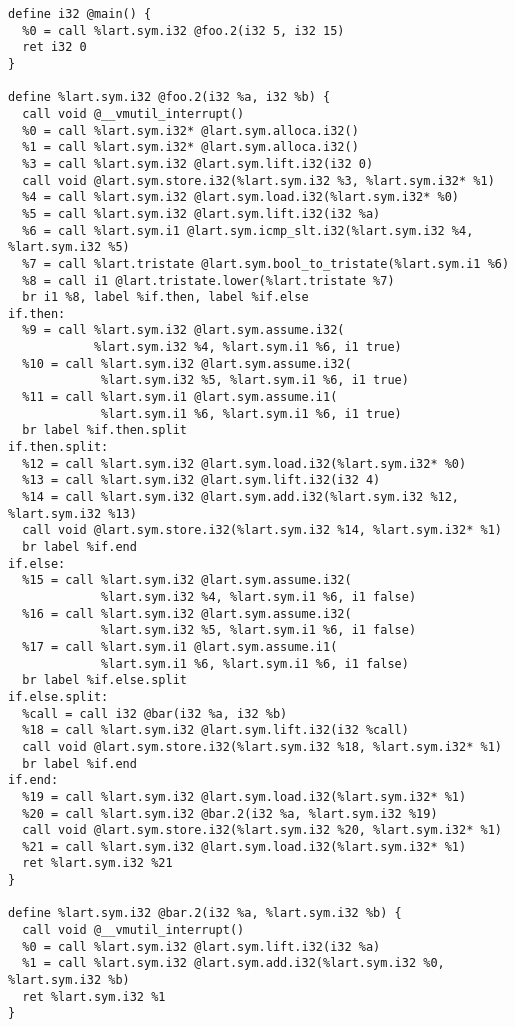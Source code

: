 \begin{verbatim}
define i32 @main() {
  %0 = call %lart.sym.i32 @foo.2(i32 5, i32 15)
  ret i32 0
}

define %lart.sym.i32 @foo.2(i32 %a, i32 %b) {
  call void @__vmutil_interrupt()
  %0 = call %lart.sym.i32* @lart.sym.alloca.i32()
  %1 = call %lart.sym.i32* @lart.sym.alloca.i32()
  %3 = call %lart.sym.i32 @lart.sym.lift.i32(i32 0)
  call void @lart.sym.store.i32(%lart.sym.i32 %3, %lart.sym.i32* %1)
  %4 = call %lart.sym.i32 @lart.sym.load.i32(%lart.sym.i32* %0)
  %5 = call %lart.sym.i32 @lart.sym.lift.i32(i32 %a)
  %6 = call %lart.sym.i1 @lart.sym.icmp_slt.i32(%lart.sym.i32 %4, %lart.sym.i32 %5)
  %7 = call %lart.tristate @lart.sym.bool_to_tristate(%lart.sym.i1 %6)
  %8 = call i1 @lart.tristate.lower(%lart.tristate %7)
  br i1 %8, label %if.then, label %if.else
if.then:
  %9 = call %lart.sym.i32 @lart.sym.assume.i32(
            %lart.sym.i32 %4, %lart.sym.i1 %6, i1 true)
  %10 = call %lart.sym.i32 @lart.sym.assume.i32(
             %lart.sym.i32 %5, %lart.sym.i1 %6, i1 true)
  %11 = call %lart.sym.i1 @lart.sym.assume.i1(
             %lart.sym.i1 %6, %lart.sym.i1 %6, i1 true)
  br label %if.then.split
if.then.split:
  %12 = call %lart.sym.i32 @lart.sym.load.i32(%lart.sym.i32* %0)
  %13 = call %lart.sym.i32 @lart.sym.lift.i32(i32 4)
  %14 = call %lart.sym.i32 @lart.sym.add.i32(%lart.sym.i32 %12, %lart.sym.i32 %13)
  call void @lart.sym.store.i32(%lart.sym.i32 %14, %lart.sym.i32* %1)
  br label %if.end
if.else:
  %15 = call %lart.sym.i32 @lart.sym.assume.i32(
             %lart.sym.i32 %4, %lart.sym.i1 %6, i1 false)
  %16 = call %lart.sym.i32 @lart.sym.assume.i32(
             %lart.sym.i32 %5, %lart.sym.i1 %6, i1 false)
  %17 = call %lart.sym.i1 @lart.sym.assume.i1(
             %lart.sym.i1 %6, %lart.sym.i1 %6, i1 false)
  br label %if.else.split
if.else.split:
  %call = call i32 @bar(i32 %a, i32 %b)
  %18 = call %lart.sym.i32 @lart.sym.lift.i32(i32 %call)
  call void @lart.sym.store.i32(%lart.sym.i32 %18, %lart.sym.i32* %1)
  br label %if.end
if.end:
  %19 = call %lart.sym.i32 @lart.sym.load.i32(%lart.sym.i32* %1)
  %20 = call %lart.sym.i32 @bar.2(i32 %a, %lart.sym.i32 %19)
  call void @lart.sym.store.i32(%lart.sym.i32 %20, %lart.sym.i32* %1)
  %21 = call %lart.sym.i32 @lart.sym.load.i32(%lart.sym.i32* %1)
  ret %lart.sym.i32 %21
}

define %lart.sym.i32 @bar.2(i32 %a, %lart.sym.i32 %b) {
  call void @__vmutil_interrupt()
  %0 = call %lart.sym.i32 @lart.sym.lift.i32(i32 %a)
  %1 = call %lart.sym.i32 @lart.sym.add.i32(%lart.sym.i32 %0, %lart.sym.i32 %b)
  ret %lart.sym.i32 %1
}
\end{verbatim}


